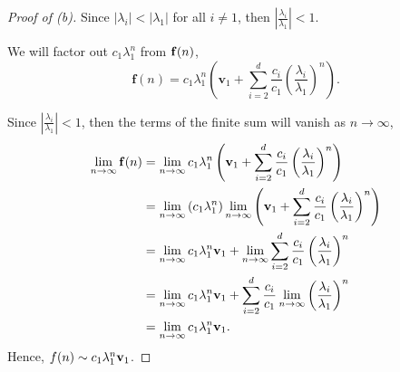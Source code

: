 \documentclass[../hw1]{subfiles}
\begin{document}
\begin{proof}[Proof of (b)]
	Since $|\lambda_i| < |\lambda_1|$ for all $i\neq 1$, then $\left| \frac{\lambda_i}{\lambda_1} \right| < 1$.

	We will factor out $c_1 \lambda_1^n$ from $\bf{f}(n)$, \[
		\mathbf{f}(n)=c_1 \lambda_1^n \left( \mathbf{v}_1 + \sum_{i=2}^{d} \frac{c_i}{c_1} \left( \frac{\lambda_i}{\lambda_1} \right)^n  \right)
		.\]

	Since  $\left| \frac{\lambda_i}{\lambda_1} \right| < 1$, then the terms of the finite sum will vanish as $n\to \infty$,
	\begin{align*}
		\lim_{n \to \infty} \bf{f}(n) & =
		\lim_{n \to \infty} c_1 \lambda_1^n \left( \mathbf{v}_1 + \sum_{i=2}^{d} \frac{c_i}{c_1} \left( \frac{\lambda_i}{\lambda_1} \right)^n  \right)                                                                                                 \\
		                              & = \lim_{n \to \infty} \left( c_1 \lambda_1^n \right)
		\lim_{n \to \infty} \left( \mathbf{v}_1 + \sum_{i=2}^{d} \frac{c_i}{c_1} \left( \frac{\lambda_i}{\lambda_1} \right)^n \right)                                                                                                                  \\
		                              & = \lim_{n \to \infty}c_1\lambda_1^n \bf{v}_1 +                                                                 \lim_{n \to \infty} \sum_{i=2}^{d} \frac{c_i}{c_1} \left( \frac{\lambda_i}{\lambda_1} \right)^n \\
		                              & = \lim_{n \to \infty}c_1\lambda_1^n \bf{v}_1 + \sum_{i=2}^{d} \frac{c_i}{c_1} \lim_{n \to \infty} \left( \frac{\lambda_i}{\lambda_1} \right)^n                                                                 \\
		                              & = \lim_{n \to \infty} c_1 \lambda_1^n \bf{v}_1
		.\end{align*}
	Hence, $f(n)\sim c_1\lambda_1^n \bf{v}_1$.
\end{proof}
\end{document}
